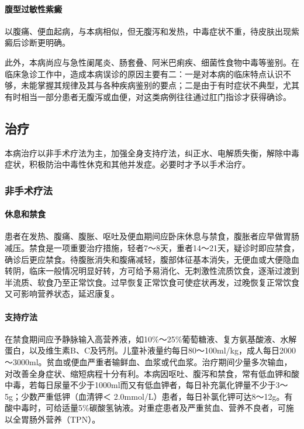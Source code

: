 \paragraph{腹型过敏性紫癜}

以腹痛、便血起病，与本病相似，但无腹泻和发热，中毒症状不重，待皮肤出现紫癜后诊断更明确。

此外，本病尚应与急性阑尾炎、肠套叠、阿米巴痢疾、细菌性食物中毒等鉴别。在临床急诊工作中，造成本病误诊的原因主要有二：一是对本病的临床特点认识不够，未能掌握其规律及其与各种疾病鉴别的要点；二是由于有时症状不典型，尤其有时相当一部分患者无腹泻或血便，对这类病例往往通过肛门指诊才获得确诊。

\subsection{治疗}

本病治疗以非手术疗法为主，加强全身支持疗法，纠正水、电解质失衡，解除中毒症状，积极防治中毒性休克和其他并发症。必要时才予以手术治疗。

\subsubsection{非手术疗法}

\paragraph{休息和禁食}

患者在发热、腹痛、腹胀、呕吐及便血期间应卧床休息与禁食，腹胀者应早做胃肠减压。禁食是一项重要治疗措施，轻者7～8天，重者14～21天，疑诊时即应禁食，确诊后更应禁食。待腹胀消失和腹痛减轻，腹部体征基本消失，无便血或大便隐血转阴，临床一般情况明显好转，方可给予易消化、无刺激性流质饮食，逐渐过渡到半流质、软食乃至正常饮食。过早恢复正常饮食可使症状再发，过晚恢复正常饮食又可影响营养状态，延迟康复。

\paragraph{支持疗法}

在禁食期间应予静脉输入高营养液，如10\%～25\%葡萄糖液、复方氨基酸液、水解蛋白，以及维生素B、C及钙剂。儿童补液量约每日80～100ml/kg，成人每日2000～3000ml。贫血或便血严重者输鲜血、血浆或代血浆。治疗期间少量多次输血，对改善全身症状、缩短病程十分有利。本病因呕吐、腹泻和禁食，常有低血钾和酸中毒，若每日尿量不少于1000ml而又有低血钾者，每日补充氯化钾量不少于3～5g；少数严重低钾（血清钾＜
2.0mmol/L）患者，每日补氯化钾可达8～12g。有酸中毒时，可给适量5\%碳酸氢钠液。对重症患者及严重贫血、营养不良者，可施以全胃肠外营养（TPN）。

